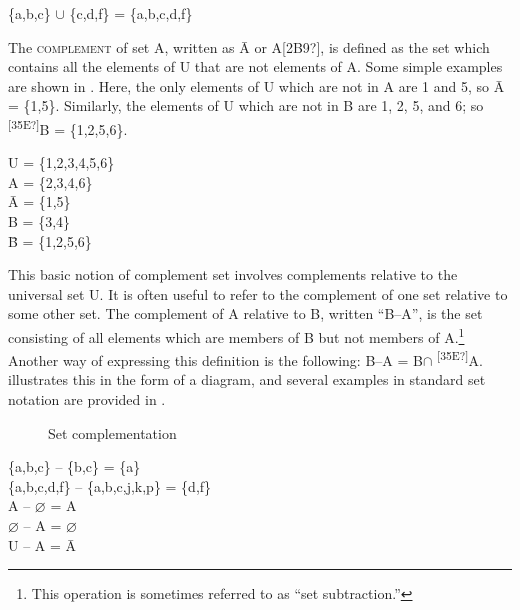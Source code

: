 \begin{stylepoints}
\{a,b,c\} ${\cup}$ \{c,d,f\} = \{a,b,c,d,f\}
\end{stylepoints}


The \textsc{complement} of set A, written as \=A or A[2B9?], is defined as the set which contains all the elements of U that are not elements of A. Some simple examples are shown in . Here, the only elements of U which are not in A are 1 and 5, so \=A = \{1,5\}. Similarly, the elements of U which are not in B are 1, 2, 5, and 6; so \textsuperscript{ [35E?]}B = \{1,2,5,6\}.


\ea
U = \{1,2,3,4,5,6\}\\
A = \{2,3,4,6\}\\
\=A = \{1,5\}\\
B = \{3,4\}\\
\=B = \{1,2,5,6\}
\z


This basic notion of complement set involves complements relative to the universal set U. It is often useful to refer to the complement of one set relative to some other set. The complement of A relative to B, written “B–A”, is the set consisting of all elements which are members of B but not members of A.\footnote{This operation is sometimes referred to as “set subtraction.”} Another way of expressing this definition is the following: B–A = B${\cap}$\textsuperscript{ [35E?]}A.  illustrates this in the form of a diagram, and several examples in standard set notation are provided in .

\begin{figure}
  
\caption{\label{fig:key:4} Set complementation}
\end{figure}

\begin{stylepoints}
\{a,b,c\} – \{b,c\} = \{a\}\\
\{a,b,c,d,f\} – \{a,b,c,j,k,p\} = \{d,f\}\\
A – ⌀ = A\\
⌀ – A = ⌀\\
U – A = \=A
\end{stylepoints}


